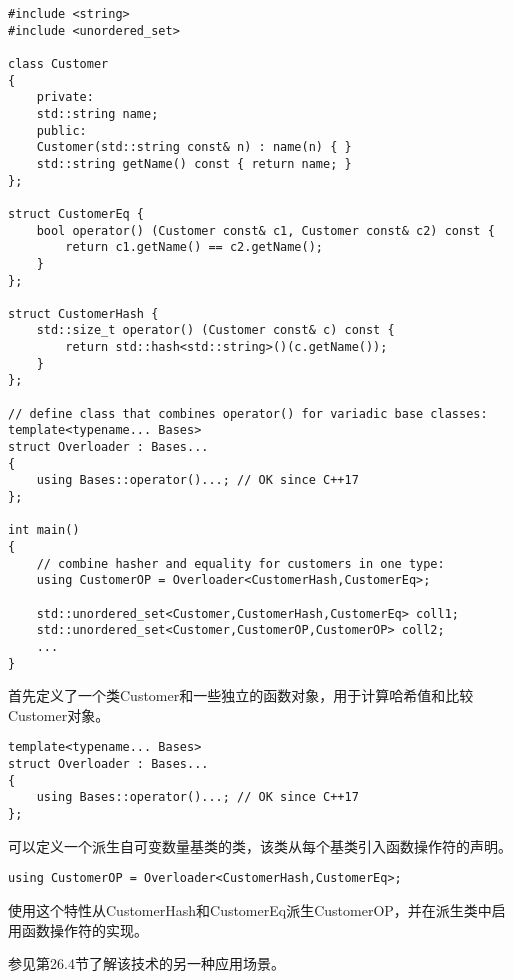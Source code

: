 \begin{lstlisting}[style=styleCXX]
#include <string>
#include <unordered_set>

class Customer
{
	private:
	std::string name;
	public:
	Customer(std::string const& n) : name(n) { }
	std::string getName() const { return name; }
};

struct CustomerEq {
	bool operator() (Customer const& c1, Customer const& c2) const {
		return c1.getName() == c2.getName();
	}
};

struct CustomerHash {
	std::size_t operator() (Customer const& c) const {
		return std::hash<std::string>()(c.getName());
	}
};

// define class that combines operator() for variadic base classes:
template<typename... Bases>
struct Overloader : Bases...
{
	using Bases::operator()...; // OK since C++17
};

int main()
{
	// combine hasher and equality for customers in one type:
	using CustomerOP = Overloader<CustomerHash,CustomerEq>;
	
	std::unordered_set<Customer,CustomerHash,CustomerEq> coll1;
	std::unordered_set<Customer,CustomerOP,CustomerOP> coll2;
	...
}
\end{lstlisting}

首先定义了一个类Customer和一些独立的函数对象，用于计算哈希值和比较Customer对象。

\begin{lstlisting}[style=styleCXX]
template<typename... Bases>
struct Overloader : Bases...
{
	using Bases::operator()...; // OK since C++17
};
\end{lstlisting}

可以定义一个派生自可变数量基类的类，该类从每个基类引入函数操作符的声明。

\begin{lstlisting}[style=styleCXX]
using CustomerOP = Overloader<CustomerHash,CustomerEq>;
\end{lstlisting}

使用这个特性从CustomerHash和CustomerEq派生CustomerOP，并在派生类中启用函数操作符的实现。

参见第26.4节了解该技术的另一种应用场景。


























